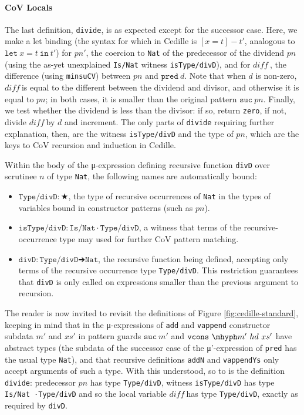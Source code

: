 \documentclass{article}
\newcommand{\difnd}{\ensuremath{di\!f\!f\ }}
\begin{document}
\paragraph{\textbf{CoV Locals}}
The last definition, \texttt{divide}, is as expected except for the successor
case. Here, we make a let binding (the syntax for which in Cedille is \([x = t]
- t'\), analogous to \(\texttt{let}\ x = t\ \texttt{in}\ t'\)) for $pn'$, the
coercion to \texttt{Nat} of the predecessor of the dividend $pn$ (using the
as-yet unexplained \texttt{Is/Nat} witness \texttt{isType/divD}), and for
\difnd, the difference (using \texttt{minsuCV}) between $pn$ and \(\texttt{pred}\
d\). Note that when $d$ is non-zero, \difnd is equal to the different between
the dividend and divisor, and otherwise it is equal to $pn$; in both cases, it
is smaller than the original pattern \(\texttt{suc}\ pn\). Finally, we test
whether the dividend is less than the divisor: if so, return \texttt{zero}, if
not, divide \difnd by $d$ and increment. The only parts of \texttt{divide}
requiring further explanation, then, are the witness \texttt{isType/divD} and the
type of $pn$, which are the keys to CoV recursion and induction in Cedille.

Within the body of the μ-expression defining recursive function
\texttt{divD} over scrutinee $n$ of type \texttt{Nat}, the following
names are automatically bound:
\begin{itemize}
\item \(\texttt{Type/divD}: ★\), the type of recursive occurrences of \texttt{Nat}
  in the types of variables bound in constructor patterns (such as $pn$).
\item \(\texttt{isType/divD}: \texttt{Is/Nat} ·\texttt{Type/divD}\), a witness that terms of the
  recursive-occurrence type may used for further CoV pattern matching.
\item \(\texttt{divD}: \texttt{Type/divD} ➔ \texttt{Nat}\),
  the recursive function being defined, accepting only terms of the
  recursive occurrence type \texttt{Type/divD}. This restriction guarantees that
  \texttt{divD} is only called on expressions smaller than the previous
  argument to recursion.
\end{itemize}

The reader is now invited to revisit the definitions of Figure
\ref{fig:cedille-standard}, keeping in mind that in the μ-expressions of
\texttt{add} and \texttt{vappend} constructor subdata $m'$ and $xs'$
in pattern guards \(\texttt{suc}\ m'\) and \(\texttt{vcons}\ \mhyph m'\ hd\ xs'\)
have abstract types (the subdata of the successor case of the
μ'-expression of \texttt{pred} has the usual type \texttt{Nat}), and
that recursive definitions \texttt{addN} and \texttt{vappendYs} only accept
arguments of such a type. With this understood, so to is the definition
\texttt{divide}: predecessor $pn$ has type \texttt{Type/divD}, witness
\texttt{isType/divD} has type \texttt{Is/Nat ·Type/divD} and so the local
variable \difnd has type \texttt{Type/divD}, exactly as required by
\texttt{divD}.
\end{document}
